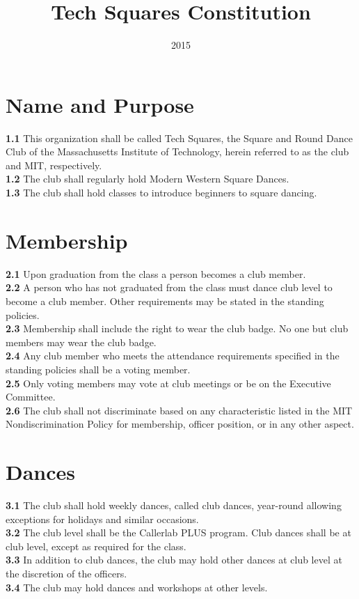 \documentclass{article}
\title{Tech Squares Constitution}
\date{2015}
\begin{document}
\maketitle
\section {Name and Purpose} 
\textbf{1.1} This organization shall be called Tech Squares, the Square and Round Dance Club of the Massachusetts Institute of Technology, herein referred to as the club and MIT, respectively.\\
\textbf{1.2} The club shall regularly hold Modern Western Square Dances.\\
\textbf{1.3} The club shall hold classes to introduce beginners to square dancing.
\section {Membership}
\textbf{2.1} Upon graduation from the class a person becomes a club member.\\
\textbf{2.2} A person who has not graduated from the class must dance club level to become a club member. Other requirements may be stated in the standing policies.\\
\textbf{2.3} Membership shall include the right to wear the club badge. No one but club members may wear the club badge.\\
\textbf{2.4} Any club member who meets the attendance requirements specified in the standing policies shall be a voting member.\\
\textbf{2.5} Only voting members may vote at club meetings or be on the Executive Committee. \\
\textbf{2.6} The club shall not discriminate based on any characteristic listed in the MIT Nondiscrimination Policy for membership, officer position, or in any other aspect.
\section{Dances}
\textbf{3.1} The club shall hold weekly dances, called club dances, year-round allowing exceptions for holidays and similar occasions.\\
\textbf{3.2} The club level shall be the Callerlab PLUS program. Club dances shall be at club level, except as required for the class.\\
\textbf{3.3} In addition to club dances, the club may hold other dances at club level at the discretion of the officers. \\
\textbf{3.4} The club may hold dances and workshops at other levels.
\end{document}
